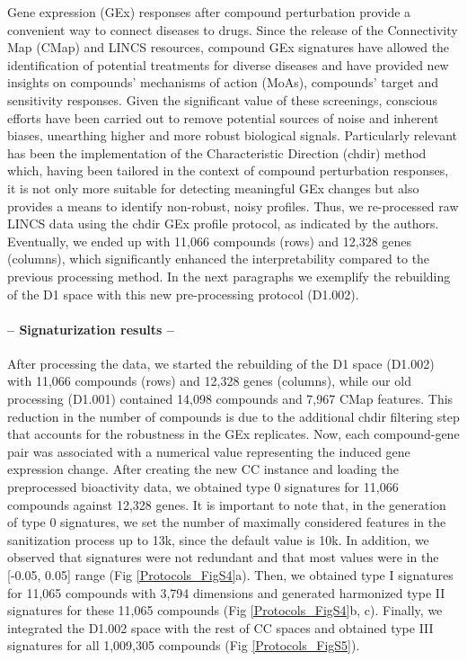 Gene expression (GEx) responses after compound perturbation provide a convenient way to connect diseases to drugs. Since the release of the Connectivity Map (CMap) and LINCS resources, compound GEx signatures have allowed the identification of potential treatments for diverse diseases \cite{pauls_identification_2021, sawada_predicting_2018, chen_reversal_2017} and have provided new insights on compounds’ mechanisms of action (MoAs), compounds’ target and sensitivity responses. Given the significant value of these screenings, conscious efforts have been carried out to remove potential sources of noise and inherent biases, unearthing higher and more robust biological signals. Particularly relevant has been the implementation of the Characteristic Direction (chdir) method\cite{clark_characteristic_2014} which, having been tailored in the context of compound perturbation responses, it is not only more suitable for detecting meaningful GEx changes but also provides a means to identify non-robust, noisy profiles. Thus, we re-processed raw LINCS data using the chdir GEx profile protocol, as indicated by the authors. Eventually, we ended up with 11,066 compounds (rows) and 12,328 genes (columns), which significantly enhanced the interpretability compared to the previous processing method. In the next paragraphs we exemplify the rebuilding of the D1 space with this new pre-processing protocol (D1.002). 

\paragraph{-- Signaturization results --}  \leavevmode

After processing the data, we started the rebuilding of the D1 space (D1.002) with 11,066 compounds (rows) and 12,328 genes (columns), while our old processing (D1.001) contained 14,098 compounds and 7,967 CMap features. This reduction in the number of compounds is due to the additional chdir filtering step that accounts for the robustness in the GEx replicates. Now, each compound-gene pair was associated with a numerical value representing the induced gene expression change. After creating the new CC instance and loading the preprocessed bioactivity data, we obtained type 0 signatures for 11,066 compounds against 12,328 genes. It is important to note that, in the generation of type 0 signatures, we set the number of maximally considered features in the sanitization process up to 13k, since the default value is 10k. In addition, we observed that signatures were not redundant and that most values were in the [-0.05, 0.05] range (Fig \ref{Protocols_FigS4}a). Then, we obtained type I signatures for 11,065 compounds with 3,794 dimensions and generated harmonized type II signatures for these 11,065 compounds (Fig \ref{Protocols_FigS4}b, c). Finally, we integrated the D1.002 space with the rest of CC spaces and obtained type III signatures for all 1,009,305 compounds (Fig \ref{Protocols_FigS5}). 

